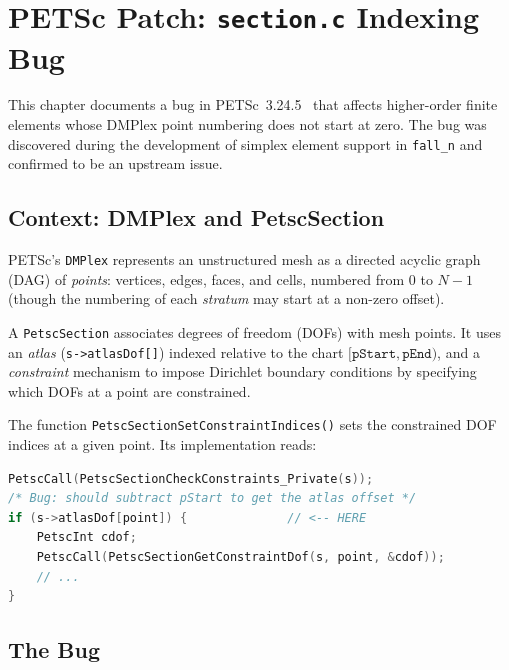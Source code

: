 
\chapter{PETSc Patch: \texttt{section.c} Indexing Bug}
\label{ch:petsc}

This chapter documents a bug in PETSc~3.24.5~\cite{PETSc2024} that affects
higher-order finite elements whose DMPlex point numbering does not start at
zero.  The bug was discovered during the development of simplex element support
in \texttt{fall\_n} and confirmed to be an upstream issue.


\section{Context: DMPlex and PetscSection}
\label{sec:dmplex_context}

PETSc's \texttt{DMPlex} represents an unstructured mesh as a directed acyclic
graph (DAG) of \emph{points}: vertices, edges, faces, and cells, numbered from
$0$ to $N-1$ (though the numbering of each \emph{stratum} may start at a
non-zero offset).

A \texttt{PetscSection} associates degrees of freedom (DOFs) with mesh points.
It uses an \emph{atlas} (\texttt{s->atlasDof[]}) indexed relative to the
chart $[\texttt{pStart}, \texttt{pEnd})$, and a \emph{constraint} mechanism
to impose Dirichlet boundary conditions by specifying which DOFs at a point
are constrained.

The function \texttt{PetscSectionSetConstraintIndices()} sets the constrained
DOF indices at a given point.  Its implementation reads:
\begin{lstlisting}[language=C]
PetscCall(PetscSectionCheckConstraints_Private(s));
/* Bug: should subtract pStart to get the atlas offset */
if (s->atlasDof[point]) {              // <-- HERE
    PetscInt cdof;
    PetscCall(PetscSectionGetConstraintDof(s, point, &cdof));
    // ...
}
\end{lstlisting}


\section{The Bug}
\label{sec:the_bug}

